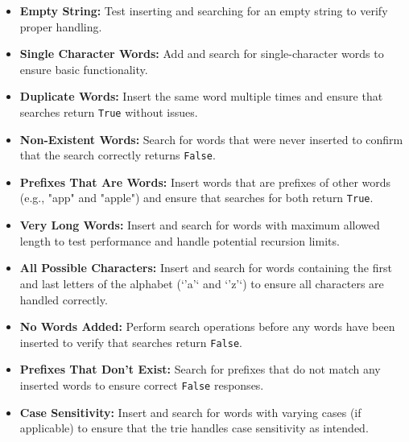 \begin{itemize}
    \item \textbf{Empty String:}  
    Test inserting and searching for an empty string to verify proper handling.
    
    \item \textbf{Single Character Words:}  
    Add and search for single-character words to ensure basic functionality.
    
    \item \textbf{Duplicate Words:}  
    Insert the same word multiple times and ensure that searches return \texttt{True} without issues.
    
    \item \textbf{Non-Existent Words:}  
    Search for words that were never inserted to confirm that the search correctly returns \texttt{False}.
    
    \item \textbf{Prefixes That Are Words:}  
    Insert words that are prefixes of other words (e.g., "app" and "apple") and ensure that searches for both return \texttt{True}.
    
    \item \textbf{Very Long Words:}  
    Insert and search for words with maximum allowed length to test performance and handle potential recursion limits.
    
    \item \textbf{All Possible Characters:}  
    Insert and search for words containing the first and last letters of the alphabet (`'a'` and `'z'`) to ensure all characters are handled correctly.
    
    \item \textbf{No Words Added:}  
    Perform search operations before any words have been inserted to verify that searches return \texttt{False}.
    
    \item \textbf{Prefixes That Don't Exist:}  
    Search for prefixes that do not match any inserted words to ensure correct \texttt{False} responses.
    
    \item \textbf{Case Sensitivity:}  
    Insert and search for words with varying cases (if applicable) to ensure that the trie handles case sensitivity as intended.
\end{itemize}

